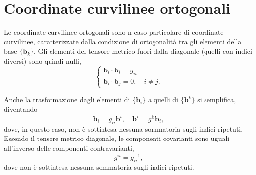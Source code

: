 \section{Coordinate curvilinee ortogonali}\label{ch:tensori:coordinate_ortogonali}


 Le coordinate curvilinee ortogonali sono n caso particolare di coordinate curvilinee, caratterizzate dalla condizione di ortogonalità tra gli elementi della base $\{ \bm{b}_k \}$. Gli elementi del tensore metrico fuori dalla diagonale (quelli con indici diversi) sono
 quindi nulli,
 \begin{equation}
 \begin{cases}
   \bm{b}_i \cdot \bm{b}_i = g_{ii} \\
   \bm{b}_i \cdot \bm{b}_j = 0     , \quad  i \neq j .
 \end{cases}
 \end{equation}
 
 \noindent
 Anche la trasformazione dagli elementi di $\{ \bm{b}_i \}$ a quelli di $\{ \bm{b}^k \}$ si semplifica, diventando
 \begin{equation}
  \bm{b}_i = g_{ii} \bm{b}^i  , \quad \bm{b}^i = g^{ii} \bm{b}_i ,
 \end{equation}
 dove, in questo caso, non è sottintesa nessuna sommatoria sugli indici ripetuti.
 Essendo il tensore metrico diagonale, le componenti covarianti sono uguali all'inverso delle componenti contravarianti,
 \begin{equation}
  g^{ii} = g_{ii}^{-1} ,
 \end{equation}
 dove non è sottintesa nessuna sommatoria sugli indici ripetuti.
%
